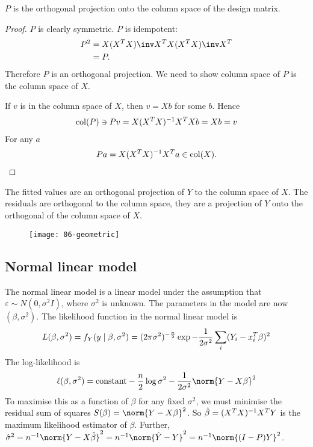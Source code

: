 \begin{proposition}
	$P$ is the orthogonal projection onto the column space of the design matrix.
\end{proposition}

\begin{proof}
	$P$ is clearly symmetric.
	$P$ is idempotent:
	\begin{align*}
		P^2 &= X (X^\tran X)\inv X^\tran X (X^\tran X)\inv X^\tran \\
		&= P.
	\end{align*}
	Therefore $P$ is an orthogonal projection.
	We need to show column space of $P$ is the column space of $X$. 

	If $v$ is in the column space of $X$, then $v = Xb$ for some $b$.
	Hence
	\begin{align*}
		\operatorname{col}(P) \ni Pv = X(X^T X)^{-1} X^T X b = Xb = v
	\end{align*}
	For any $a$ 
	\begin{align*}
		Pa = X(X^T X)^{-1} X^T a \in \operatorname{col}(X).
	\end{align*} 
\end{proof}

\begin{corollary}
	The fitted values are an orthogonal projection of $Y$ to the column space of $X$.
	The residuals are orthogonal to the column space, they are a projection of $Y$ onto the orthogonal of the column space of $X$. 
\end{corollary}

\begin{figure}[h] 
    \centering 
    \texttt{[image: 06-geometric]} 
\end{figure}

\subsection{Normal linear model}

The normal linear model is a linear model under the assumption that $\varepsilon \sim N(0,\sigma^2 I)$, where $\sigma^2$ is unknown.
The parameters in the model are now $(\beta, \sigma^2)$.
The likelihood function in the normal linear model is
\begin{align*}
	L(\beta, \sigma^2) = f_Y(y\mid \beta,\sigma^2) = (2\pi \sigma^2)^{-\frac{n}{2}} \exp{-\frac{1}{2\sigma^2} \sum_i (Y_i - x_i^T\beta)^2}
\end{align*}
The log-likelihood is
\begin{align*}
	\ell(\beta,\sigma^2) = \text{constant} - \frac{n}{2}\log \sigma^2 - \frac{1}{2\sigma^2} \norm{Y-X\beta}^2
\end{align*}
To maximise this as a function of $\beta$ for any fixed $\sigma^2$, we must minimise the residual sum of squares $S(\beta) = \norm{Y-X\beta}^2$.
So $\hat \beta = (X^T X)^{-1} X^T Y$ is the maximum likelihood estimator of $\beta$.
Further, $\hat \sigma^2 = n^{-1} \norm{Y-X\hat\beta}^2 = n^{-1} \norm{\hat Y - Y}^2 = n^{-1} \norm{(I-P)Y}^2$.

